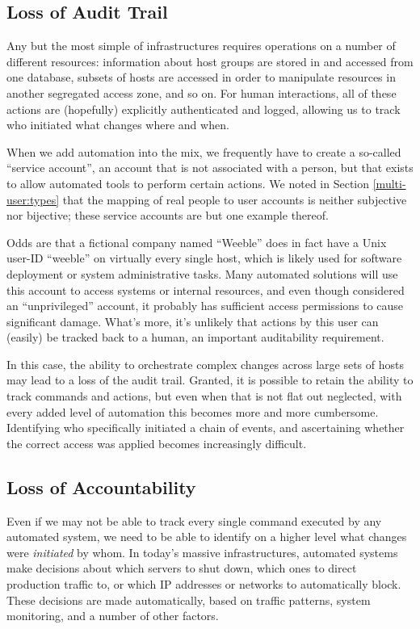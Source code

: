 \subsection{Loss of Audit Trail}
\label{automation:pitfalls:audit}

Any but the most simple of infrastructures requires
operations on a number of different resources:
information about host groups are stored in and
accessed from one database, subsets of hosts are
accessed in order to manipulate resources in another
segregated access zone, and so on.  For human
interactions, all of these actions are (hopefully)
explicitly authenticated and logged, allowing us to
track who initiated what changes where and when.

When we add automation into the mix, we frequently
have to create a so-called ``service account'', an
account that is not associated with a person, but that
exists to allow automated tools to perform certain
actions.  We noted in Section \ref{multi-user:types}
that the mapping of real people to user accounts is
neither subjective nor bijective; these service
accounts are but one example thereof.

Odds are that a fictional company named ``Weeble''
does in fact have a Unix user-ID ``weeble'' on
virtually every single host, which is likely used for
software deployment or system administrative tasks.
Many automated solutions will use this account to
access systems or internal resources, and even though
considered an ``unprivileged'' account, it probably
has sufficient access permissions to cause significant
damage.  What's more, it's unlikely that actions by
this user can (easily) be tracked back to a human, an
important auditability requirement.

In this case, the ability to orchestrate complex
changes across large sets of hosts may lead to a loss
of the audit trail.  Granted, it is possible to retain
the ability to track commands and actions, but even
when that is not flat out neglected, with every added
level of automation this becomes more and more
cumbersome.  Identifying who specifically initiated a
chain of events, and ascertaining whether the correct
access was applied becomes increasingly difficult.

\subsection{Loss of Accountability}
\label{automation:pitfalls:accountability}

Even if we may not be able to track every single
command executed by any automated system, we need to
be able to identify on a higher level what changes
were {\em initiated} by whom.  In today's massive
infrastructures, automated systems make decisions
about which servers to shut down, which ones to direct
production traffic to, or which IP addresses or
networks to automatically block.  These decisions are
made automatically, based on traffic patterns, system
monitoring, and a number of other factors.

